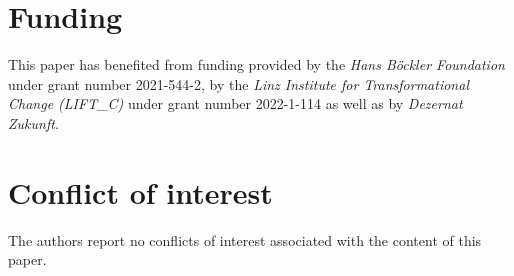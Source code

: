 \documentclass{article}
\newif\ifendfloats    %
\begin{document}
\section*{Funding}
This paper has benefited from funding provided by the \textit{Hans B\"ockler
Foundation} under grant number 2021-544-2, by the \textit{Linz Institute for
Transformational Change (LIFT\_C)} under grant number 2022-1-114 as well as by
\textit{Dezernat Zukunft}.

\section*{Conflict of interest}
The authors report no conflicts of interest associated with the content of this paper.

\medskip
\printbibliography
\ifendfloats\processdelayedfloats\fi

\appendix
\begin{refsection}

\setcounter{section}{0}
\setcounter{table}{0}
\setcounter{equation}{0}
\setcounter{figure}{0}
\ifendfloats
  \setcounter{postfigure}{0}
  \setcounter{posttable}{0}
  \renewcommand{\theposttable}{A\arabic{posttable}}
  \renewcommand*{\theHposttable}{appendix.posttable.\arabic{posttable}}
  \renewcommand{\thepostfigure}{A\arabic{postfigure}}
\fi
\renewcommand{\thetable}{A\arabic{table}}
\renewcommand*{\theHtable}{\thetable}
\renewcommand{\thefigure}{A\arabic{figure}}
\renewcommand*{\theHfigure}{\thefigure}
\renewcommand{\theequation}{A\arabic{equation}}






\printbibliography[title={Appendix references}]

\end{refsection}

\ifendfloats
  \renewcommand{\thetable}{A\arabic{table}}
  \renewcommand*{\theHtable}{\thetable}
  \renewcommand{\thefigure}{A\arabic{figure}}
  \renewcommand*{\theHfigure}{\thefigure}
  \renewcommand{\thepostfigure}{A\arabic{postfigure}}
  \renewcommand{\theposttable}{A\arabic{posttable}}
  \renewcommand*{\theHposttable}{appendix.posttable.\arabic{posttable}}
  \processdelayedfloats
\fi
\end{document}
